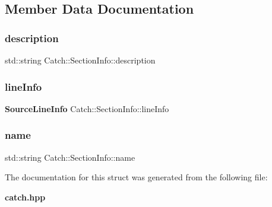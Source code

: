 \subsection{Member Data Documentation}
\mbox{\label{struct_catch_1_1_section_info_a0052060219a6de74bb7ade34d4163a4e}} 
\subsubsection{description}
{\footnotesize\ttfamily std\+::string Catch\+::\+Section\+Info\+::description}

\mbox{\label{struct_catch_1_1_section_info_adbc83b8a3507c4acc8ee249e93465711}} 
\subsubsection{line\+Info}
{\footnotesize\ttfamily \textbf{ Source\+Line\+Info} Catch\+::\+Section\+Info\+::line\+Info}

\mbox{\label{struct_catch_1_1_section_info_a704c8fc662d309137e0d4f199cb7df58}} 
\subsubsection{name}
{\footnotesize\ttfamily std\+::string Catch\+::\+Section\+Info\+::name}



The documentation for this struct was generated from the following file\+:\begin{DoxyCompactItemize}
\item 
\textbf{ catch.\+hpp}\end{DoxyCompactItemize}
